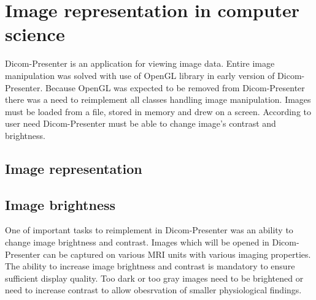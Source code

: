 \chapter*{Image representation in computer science}

Dicom-Presenter is an application for viewing image data. Entire image manipulation was solved with use of OpenGL library in early version of Dicom-Presenter. Because OpenGL was expected to be removed from Dicom-Presenter there was a need to reimplement all classes handling image manipulation. Images must be loaded from a file, stored in memory and drew on a screen. According to user need Dicom-Presenter must be able to change image's contrast and brightness. 

\section*{Image representation}




\section*{Image brightness}

One of important tasks to reimplement in Dicom-Presenter was an ability to change image brightness and contrast. Images which will be opened in Dicom-Presenter can be captured on various MRI units with various imaging properties. The ability to increase image brightness and contrast is mandatory to ensure sufficient display quality. Too dark or too gray images need to be brightened or need to increase contrast to allow obesrvation of smaller physiological findings.



